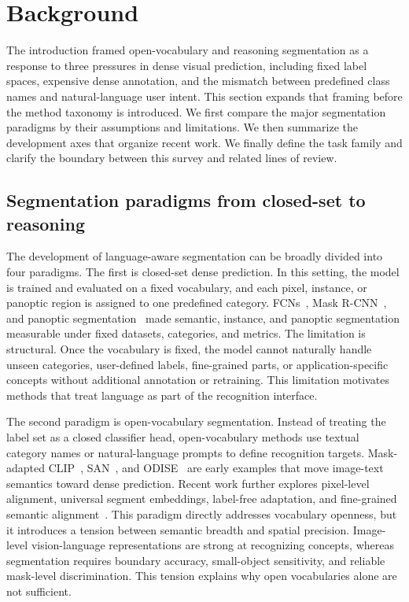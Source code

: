 \section{Background}

The introduction framed open-vocabulary and reasoning segmentation as a response to three pressures in dense visual prediction, including fixed label spaces, expensive dense annotation, and the mismatch between predefined class names and natural-language user intent. This section expands that framing before the method taxonomy is introduced. We first compare the major segmentation paradigms by their assumptions and limitations. We then summarize the development axes that organize recent work. We finally define the task family and clarify the boundary between this survey and related lines of review.

\subsection{Segmentation paradigms from closed-set to reasoning}

The development of language-aware segmentation can be broadly divided into four paradigms. The first is closed-set dense prediction. In this setting, the model is trained and evaluated on a fixed vocabulary, and each pixel, instance, or panoptic region is assigned to one predefined category. FCNs~\citep{long2015fully}, Mask R-CNN~\citep{he2017mask}, and panoptic segmentation~\citep{kirillov2019panoptic} made semantic, instance, and panoptic segmentation measurable under fixed datasets, categories, and metrics. The limitation is structural. Once the vocabulary is fixed, the model cannot naturally handle unseen categories, user-defined labels, fine-grained parts, or application-specific concepts without additional annotation or retraining. This limitation motivates methods that treat language as part of the recognition interface.

The second paradigm is open-vocabulary segmentation. Instead of treating the label set as a closed classifier head, open-vocabulary methods use textual category names or natural-language prompts to define recognition targets. Mask-adapted CLIP~\citep{liang2023ovseg}, SAN~\citep{xu2023san}, and ODISE~\citep{xu2023odise} are early examples that move image-text semantics toward dense prediction. Recent work further explores pixel-level alignment, universal segment embeddings, label-free adaptation, and fine-grained semantic alignment~\citep{xshanOpenvocabularySemanticSegmentation2024,xwangUseUniversalSegment2024,shinhOpenvocabularySemanticSegmentation2024,yxchngAligningVisionLanguageModel2026}. This paradigm directly addresses vocabulary openness, but it introduces a tension between semantic breadth and spatial precision. Image-level vision-language representations are strong at recognizing concepts, whereas segmentation requires boundary accuracy, small-object sensitivity, and reliable mask-level discrimination. This tension explains why open vocabularies alone are not sufficient.

